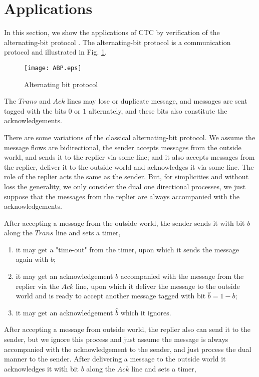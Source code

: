 \section{Applications}\label{app}

In this section, we show the applications of CTC by verification of the alternating-bit protocol \cite{ABP}. The alternating-bit protocol is a communication protocol and illustrated in Fig. \ref{ABP}.

\begin{figure}
    \centering
    \texttt{[image: ABP.eps]}
    \caption{Alternating bit protocol}
    \label{ABP}
\end{figure}

The $Trans$ and $Ack$ lines may lose or duplicate message, and messages are sent tagged with the bits $0$ or $1$ alternately, and these bits also constitute the acknowledgements.

There are some variations of the classical alternating-bit protocol. We assume the message flows are bidirectional, the sender accepts messages from the outside world, and sends it to the replier via some line; and it also accepts messages from the replier, deliver it to the outside world and acknowledges it via some line. The role of the replier acts the same as the sender. But, for simplicities and without loss the generality, we only consider the dual one directional processes, we just suppose that the messages from the replier are always accompanied with the acknowledgements.

After accepting a message from the outside world, the sender sends it with bit $b$ along the $Trans$ line and sets a timer,

\begin{enumerate}
  \item it may get a "time-out" from the timer, upon which it sends the message again with $b$;
  \item it may get an acknowledgement $b$ accompanied with the message from the replier via the $Ack$ line, upon which it deliver the message to the outside world and is ready to accept another message tagged with bit $\hat{b}=1-b$;
  \item it may get an acknowledgement $\hat{b}$ which it ignores.
\end{enumerate}

After accepting a message from outside world, the replier also can send it to the sender, but we ignore this process and just assume the message is always accompanied with the acknowledgement to the sender, and just process the dual manner to the sender. After delivering a message to the outside world it acknowledges it with bit $b$ along the $Ack$ line and sets a timer,

